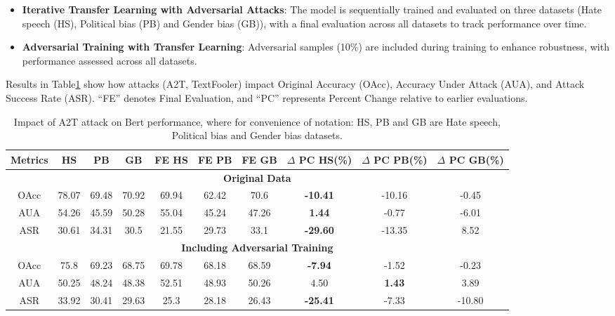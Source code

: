 \documentclass{article}
\begin{document}
\begin{itemize} 
\item \textbf{Iterative Transfer Learning with Adversarial Attacks}: The model is sequentially trained and evaluated on three datasets (Hate speech (HS), Political bias (PB) and Gender bias (GB)), with a final evaluation across all datasets to track performance over time.
\item \textbf{Adversarial Training with Transfer Learning}: Adversarial samples (10\%) are included during training to enhance robustness, with performance assessed across all datasets.
\end{itemize}

Results in Table\ref{table:adversarial_impact} show how attacks (A2T, TextFooler) impact Original Accuracy (OAcc), Accuracy Under Attack (AUA), and Attack Success Rate (ASR). ``FE'' denotes Final Evaluation, and ``PC'' represents Percent Change relative to earlier evaluations.

\begin{table}[ht]
\caption{Impact of A2T attack on Bert performance, where for convenience of notation: HS, PB and GB are Hate speech, Political bias and Gender bias datasets.}
\scriptsize
\centering
\begin{tabular}{c|ccc|ccc|ccc}
\hline
\textbf{Metrics} & {HS} & {PB} & {GB} & {FE HS} & {FE PB} & {FE GB} & \textbf{$\Delta$ PC HS(\%)} & \textbf{$\Delta$ PC PB(\%)} & \textbf{$\Delta$ PC GB(\%)} \\ \hline
\multicolumn{10}{c}{\textbf{Original Data}} \\ \hline
OAcc   & 78.07 & 69.48 & 70.92 & 69.94 & 62.42 & 70.6  & \textbf{-10.41} & -10.16 & -0.45 \\ 
AUA  & 54.26 & 45.59 & 50.28 & 55.04 & 45.24 & 47.26 & \textbf{1.44} & -0.77 & -6.01 \\ 
ASR  & 30.61 & 34.31 & 30.5  & 21.55 & 29.73 & 33.1  & \textbf{-29.60} & -13.35 & 8.52  \\ \hline
\multicolumn{10}{c}{\textbf{Including Adversarial Training}} \\ \hline
OAcc   & 75.8  & 69.23 & 68.75 & 69.78 & 68.18 & 68.59 & \textbf{-7.94} & -1.52 & -0.23 \\ 
AUA  & 50.25 & 48.24 & 48.38 & 52.51 & 48.93 & 50.26 & 4.50 & \textbf{1.43} & 3.89  \\ 
ASR  & 33.92 & 30.41 & 29.63 & 25.3  & 28.18 & 26.43 & \textbf{-25.41} & -7.33 & -10.80 \\ \hline
\end{tabular}
\label{table:adversarial_impact}
\end{table}
\end{document}
